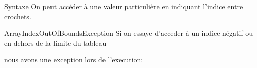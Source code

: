 \begin{frame}{Syntaxe}
    On peut accéder à une valeur particulière en indiquant l'indice entre crochets.
    
    \begin{alertblock}{ArrayIndexOutOfBoundsException}
        Si on essaye d'acceder à un indice négatif ou en dehors de la limite du tableau
        
        nous avons une exception lors de l'execution:
        
    \end{alertblock}

\end{frame}